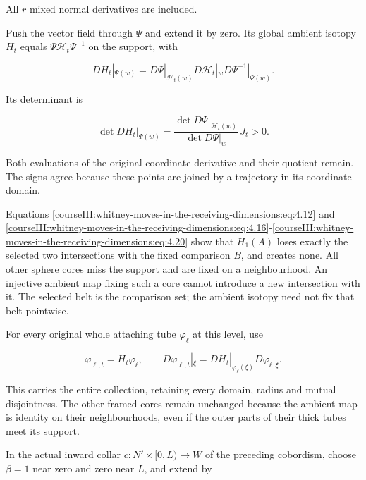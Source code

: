 All \(r\) mixed normal derivatives are included.

Push the vector field through \(\Psi\) and extend it by zero. Its global ambient isotopy \(H_t\) equals \(\Psi\mathcal H_t\Psi^{-1}\) on the support, with

\begin{equation}
DH_t|_{\Psi(w)}
   =D\Psi|_{\mathcal H_t(w)}D\mathcal H_t|_wD\Psi^{-1}|_{\Psi(w)}.
 \label{courseIII:whitney-moves-in-the-receiving-dimensions:eq:4.24}
\end{equation}

Its determinant is

\begin{equation}
\det DH_t|_{\Psi(w)}
  =\frac{\det D\Psi|_{\mathcal H_t(w)}}{\det D\Psi|_w}\,J_t>0 .
 \label{courseIII:whitney-moves-in-the-receiving-dimensions:eq:4.25}
\end{equation}

Both evaluations of the original coordinate derivative and their quotient remain. The signs agree because these points are joined by a trajectory in its coordinate domain.

Equations \eqref{courseIII:whitney-moves-in-the-receiving-dimensions:eq:4.12} and \eqref{courseIII:whitney-moves-in-the-receiving-dimensions:eq:4.16}-\eqref{courseIII:whitney-moves-in-the-receiving-dimensions:eq:4.20} show that \(H_1(A)\) loses exactly the selected two intersections with the fixed comparison \(B\), and creates none. All other sphere cores miss the support and are fixed on a neighbourhood. An injective ambient map fixing such a core cannot introduce a new intersection with it. The selected belt is the comparison set; the ambient isotopy need not fix that belt pointwise.

For every original whole attaching tube \(\varphi_\ell\) at this level, use

\begin{equation}
\varphi_{\ell,t}=H_t\varphi_\ell,\qquad
 D\varphi_{\ell,t}|_\xi
   =DH_t|_{\varphi_\ell(\xi)}D\varphi_\ell|_\xi .
 \label{courseIII:whitney-moves-in-the-receiving-dimensions:eq:4.26}
\end{equation}

This carries the entire collection, retaining every domain, radius and mutual disjointness. The other framed cores remain unchanged because the ambient map is identity on their neighbourhoods, even if the outer parts of their thick tubes meet its support.

In the actual inward collar \(c:N'\times[0,L)\to W\) of the preceding cobordism, choose \(\beta=1\) near zero and zero near \(L\), and extend by

